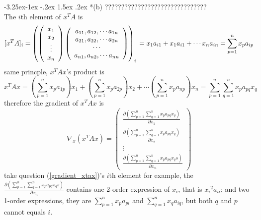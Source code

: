 \documentclass[12pt]{article}
\makeatletter
\renewcommand\subsection{\@startsection{subsection}{2}{\z@}%
	{-3.25ex\@plus -1ex \@minus -.2ex}%
	{1.5ex \@plus .2ex}%
	{\normalfont\large\bfseries}}%
\makeatother
\begin{document}
\subsection*{(b)}
{\color{red} ???????????????????????????????}\\
The $i$th element of $x^TA$ is
\begin{equation}\label{xt_a}
	[x^TA]_{i}=
	\left( 
	\left(  
	\begin{array}{c}  
		x_1 \\
		x_2 \\
		\vdots \\
		x_n 
	\end{array}
	\right)
	\left(  
	\begin{array}{c}  
		a_{11}, a_{12},\cdots a_{1n} \\
		a_{21}, a_{22},\cdots a_{2n} \\
		\cdots \\
		a_{n1}, a_{n2},\cdots a_{nn} \\
	\end{array}  
	\right)  
	\right)_{i}\\
	=x_1a_{i1} + x_1a_{i1} + \cdots x_na_{in}
	=\sum_{p=1}^n x_pa_{ip} 
\end{equation}
same princple, $x^TAx$'s product is
\begin{equation}\label{xt_a_x}
	x^TAx = (\sum_{p=1}^n x_pa_{1p})x_1 + (\sum_{p=1}^n x_pa_{2p})x_2 + \cdots (\sum_{p=1}^n x_pa_{np})x_n
	= \sum_{p=1}^n \sum_{q=1}^n x_pa_{pq}x_q
\end{equation}
therefore the gradient of $x^TAx$ is
\begin{equation}\label{gradient_xtax}
	\nabla_x(x^TAx)=
	\left(  
	\begin{array}{c}  
		\frac{\partial(\sum_{p=1}^n \sum_{q=1}^n x_pa_{pq}x_q)}{\partial x_1} \\
		\frac{\partial(\sum_{p=1}^n \sum_{q=1}^n x_pa_{pq}x_q)}{\partial x_2} \\
		\vdots \\
		\frac{\partial(\sum_{p=1}^n \sum_{q=1}^n x_pa_{pq}x_qs)}{\partial x_n} 
	\end{array}
	\right)
\end{equation}
take question (\ref{gradient_xtax})'s $i$th element for example, the $\frac{\partial(\sum_{p=1}^n \sum_{q=1}^n x_pa_{pq}x_qs)}{\partial x_n}$ contains one 2-order expression of $x_i$, that is ${x_i}^2a_{ii}$; and two 1-order expressions, they are $\sum_{p=1}^n x_pa_{pi}$ and $\sum_{q=1}^n x_qa_{iq}$, but both $q$ and $p$ cannot equals $i$.
\end{document}
